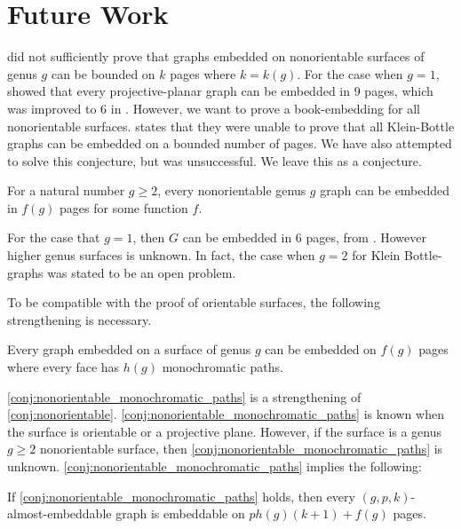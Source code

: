 
\section{Future Work}

\textcite{heathEmbeddingPlanarGraphs1984} did not sufficiently prove that graphs embedded on nonorientable surfaces of genus $g$ can be bounded on $k$ pages where $k = k(g)$. For the case when $g = 1$, \textcite{nakamotoBookEmbeddingProjectiveplanar2015} showed that every projective-planar graph can be embedded in $9$ pages, which was improved to 6 in \textcite{ozekiBookEmbeddingGraphs2019}. However, we want to prove a book-embedding for all nonorientable surfaces. 
\textcite{ozekiBookEmbeddingGraphs2019} states that they were unable to prove that all Klein-Bottle graphs can be embedded on a bounded number of pages. We have also attempted to solve this conjecture, but was unsuccessful. We leave this as a conjecture. 

\begin{conjecture}\label{conj:nonorientable}
	For a natural number $g \geq 2$, every nonorientable genus $g$ graph can be embedded in $f(g)$ pages for some function $f$. 
\end{conjecture}

For the case that $g = 1$, then $G$ can be embedded in 6 pages, from \textcite{ozekiBookEmbeddingGraphs2019}. However higher genus surfaces is unknown. In fact, the case when $g = 2$ for Klein Bottle-graphs was stated to be an open problem. 

To be compatible with the proof of orientable surfaces, the following strengthening is necessary. 
\begin{conjecture}\label{conj:nonorientable_monochromatic_paths}
	Every graph embedded on a surface of genus $g$ can be embedded on $f(g)$ pages where every face has $h(g)$ monochromatic paths. 
\end{conjecture}

\cref{conj:nonorientable_monochromatic_paths} is a strengthening of \cref{conj:nonorientable}. \cref{conj:nonorientable_monochromatic_paths} is known when the surface is orientable or a projective plane. However, if the surface is a genus $g \geq 2$ nonorientable surface, then \cref{conj:nonorientable_monochromatic_paths} is unknown. 
\cref{conj:nonorientable_monochromatic_paths} implies the following:

\begin{corollary}\label{corr:aegraphs}
	If \cref{conj:nonorientable_monochromatic_paths} holds, then every $(g, p, k)$-almost-embeddable graph is embeddable on $p h(g) (k + 1) + f(g)$ pages.
\end{corollary}

